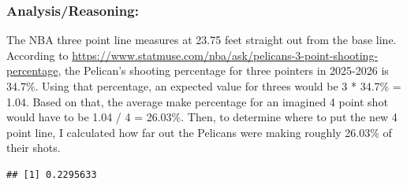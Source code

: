 \documentclass[
]{article}
\newenvironment{Shaded}{\begin{snugshade}}{\end{snugshade}}
\newcommand{\DecValTok}[1]{\textcolor[rgb]{0.00,0.00,0.81}{#1}}
\newcommand{\FunctionTok}[1]{\textcolor[rgb]{0.13,0.29,0.53}{\textbf{#1}}}
\newcommand{\NormalTok}[1]{#1}
\newcommand{\OtherTok}[1]{\textcolor[rgb]{0.56,0.35,0.01}{#1}}
\newcommand{\SpecialCharTok}[1]{\textcolor[rgb]{0.81,0.36,0.00}{\textbf{#1}}}
\newcommand{\StringTok}[1]{\textcolor[rgb]{0.31,0.60,0.02}{#1}}
\begin{document}
\subsubsection{Analysis/Reasoning:}\label{analysisreasoning}

The NBA three point line measures at 23.75 feet straight out from the
base line. According to
\url{https://www.statmuse.com/nba/ask/pelicans-3-point-shooting-percentage},
the Pelican's shooting percentage for three pointers in 2025-2026 is
34.7\%. Using that percentage, an expected value for threes would be 3 *
34.7\% = 1.04. Based on that, the average make percentage for an
imagined 4 point shot would have to be 1.04 / 4 = 26.03\%. Then, to
determine where to put the new 4 point line, I calculated how far out
the Pelicans were making roughly 26.03\% of their shots.

\begin{Shaded}
\end{Shaded}

\begin{verbatim}
## [1] 0.2295633
\end{verbatim}

\begin{Shaded}
\end{Shaded}
\end{document}
